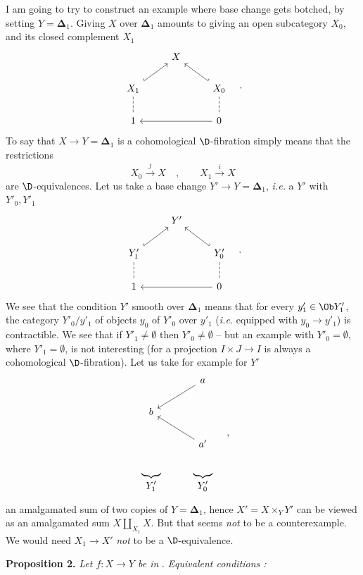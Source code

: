 \hspace*{\parindent}I am going to try to construct an example where base change gets botched, by setting $Y = \boldsymbol{\Delta}_1$. Giving $X$ over $\boldsymbol{\Delta}_1$ amounts to giving an open subcategory $X_0$, and its closed complement $X_1$
\[
\begin{tikzcd}
& X & \\
X_1 \arrow[ur, hook] \arrow[d, dash, dashed] & & X_0 \arrow[ul, hook'] \arrow[d, dash, dashed] \\
1 & & 0 \arrow[ll]
\end{tikzcd}
\quad .
\]
To say that $X \to Y = \boldsymbol{\Delta}_1$ is a cohomological $\D$-fibration simply means
that the restrictions
\[
X_0 \overset{j}{\longrightarrow} X \quad , \qquad X_1 \overset{i}{\longrightarrow} X
\]
are $\D$-equivalences. Let us take a base change $Y' \to Y = \boldsymbol{\Delta}_1$, \textit{i.e.} a $Y'$ with $Y'_0, Y'_1$
\[
\begin{tikzcd}
& Y' & \\
Y'_1 \arrow[ur, hook] \arrow[d, dash, dashed] & & Y'_0 \arrow[ul, hook'] \arrow[d, dash, dashed] \\
1 & & 0 \arrow[ll]
\end{tikzcd}
\quad .
\]
We see that the condition $Y'$ smooth over $\boldsymbol{\Delta}_1$ means that for every $y'_1 \in \Ob Y'_1$, the category $Y'_0/y'_1$ of objects $y_0$ of $Y'_0$ over $y'_1$ (\textit{i.e.} equipped with $y_0 \to y'_1$) is contractible. We see that if $Y'_1 \neq \emptyset$ then $Y'_0 \neq \emptyset$ -- but an example with $Y'_0 = \emptyset$, where $Y'_1 = \emptyset$, is not interesting
(for a projection $I \times J \to I$ is always a cohomological $\D$-fibration). Let us take for example for $Y'$
\[
\begin{tikzcd}
& a \arrow[dl] \\
b & \\
& a' \arrow[ul] \\
\underbrace{\qquad}_{\displaystyle Y'_1} & \underbrace{\qquad}_{\displaystyle Y'_0}
\end{tikzcd}
\quad ,
\]
an amalgamated sum of two copies of $Y = \boldsymbol{\Delta}_1$, hence $X' = X \times_Y Y'$ can be viewed as an amalgamated sum $X \amalg_{X_1} X$. But that seems \textit{not} to be a counterexample. We would need $X_1 \to X'$ \textit{not} to be a $\D$-equivalence.


\textbf{Proposition 2.} \textit{Let $f : X \to Y$ be in} \Dia. \textit{Equivalent conditions :}

